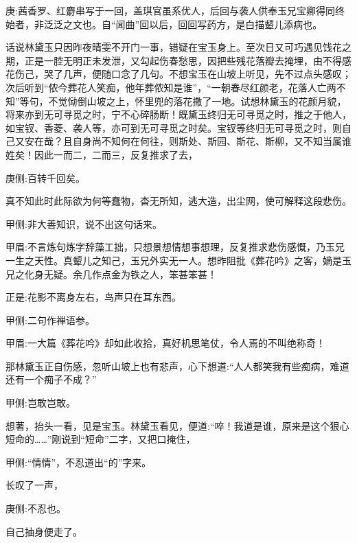 

\begin{parag}
    \begin{note}庚:茜香罗、红麝串写于一回，盖琪官虽系优人，后回与袭人供奉玉兄宝卿得同终始者，非泛泛之文也。自“闻曲”回以后，回回写药方，是白描颦儿添病也。\end{note}
\end{parag}


\begin{parag}
    话说林黛玉只因昨夜晴雯不开门一事，错疑在宝玉身上。至次日又可巧遇见饯花之期，正是一腔无明正未发泄，又勾起伤春愁思，因把些残花落瓣去掩埋，由不得感花伤己，哭了几声，便随口念了几句。不想宝玉在山坡上听见，先不过点头感叹；次后听到“侬今葬花人笑痴，他年葬侬知是谁”，“一朝春尽红颜老，花落人亡两不知”等句，不觉恸倒山坡之上，怀里兜的落花撒了一地。试想林黛玉的花颜月貌，将来亦到无可寻觅之时，宁不心碎肠断！既黛玉终归无可寻觅之时，推之于他人，如宝钗、香菱、袭人等，亦可到无可寻觅之时矣。宝钗等终归无可寻觅之时，则自己又安在哉？且自身尚不知何在何往，则斯处、斯园、斯花、斯柳，又不知当属谁姓矣！因此一而二，二而三，反复推求了去，\begin{note}庚侧:百转千回矣。\end{note}真不知此时此际欲为何等蠢物，杳无所知，逃大造，出尘网，使可解释这段悲伤。\begin{note}甲侧:非大善知识，说不出这句话来。\end{note}\begin{note}甲眉:不言炼句炼字辞藻工拙，只想景想情想事想理，反复推求悲伤感慨，乃玉兄一生之天性。真颦儿之知己，玉兄外实无一人。想昨阻批《葬花吟》之客，嫡是玉兄之化身无疑。余几作点金为铁之人，笨甚笨甚！\end{note}正是:花影不离身左右，鸟声只在耳东西。\begin{note}甲侧:二句作禅语参。\end{note}\begin{note}甲眉:一大篇《葬花吟》却如此收拾，真好机思笔仗，令人焉的不叫绝称奇！\end{note}
\end{parag}


\begin{parag}
    那林黛玉正自伤感，忽听山坡上也有悲声，心下想道:“人人都笑我有些痴病，难道还有一个痴子不成？”\begin{note}甲侧:岂敢岂敢。\end{note}想著，抬头一看，见是宝玉。林黛玉看见，便道:“啐！我道是谁，原来是这个狠心短命的……”刚说到“短命”二字，又把口掩住，\begin{note}甲侧:“情情”，不忍道出“的”字来。\end{note}长叹了一声，\begin{note}庚侧:不忍也。\end{note}自己抽身便走了。
\end{parag}


